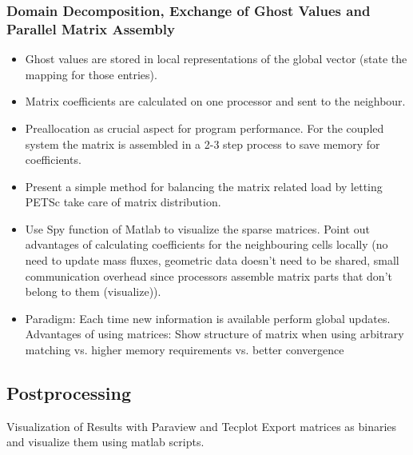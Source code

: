 \subsubsection{Domain Decomposition, Exchange of Ghost Values and Parallel Matrix Assembly}

\begin{itemize}
\item Ghost values are stored in local representations of the global vector (state the mapping for those entries). 
\item Matrix coefficients are calculated on one processor and sent to the neighbour. 
\item Preallocation as crucial aspect for program performance. For the coupled system the matrix is assembled in a 2-3 step process to save memory for coefficients. 
\item Present a simple method for balancing the matrix related load by letting PETSc take care of matrix distribution. 
\item Use Spy function of Matlab to visualize the sparse matrices. Point out advantages of calculating coefficients for the neighbouring cells locally (no need to update mass fluxes, geometric data doesn't need to be shared, small communication overhead since processors assemble matrix parts that don't belong to them (visualize)). 
\item Paradigm: Each time new information is available perform global updates. Advantages of using matrices: Show structure of matrix when using arbitrary matching vs. higher memory requirements vs. better convergence
\end{itemize}

\subsection{Postprocessing}

Visualization of Results with Paraview and Tecplot
Export matrices as binaries and visualize them using matlab scripts.
